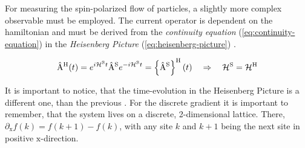 
For measuring the spin-polarized flow of particles, a slightly more complex observable must be employed. 
The current operator is dependent on the hamiltonian and must be derived from the \emph{continuity equation} (\autoref{eq:continuity-equation}) in the \emph{Heisenberg Picture} (\autoref{eq:heisenberg-picture}) \cite{discreteDivergenceAndOtherCurrentDerivation}.

\begin{equation}
    \label{eq:heisenberg-picture}
    \begin{split}
        \AopOfT[\heisenbergPicture] &= e^{i \pictureHamiltonian[\schroedingerPicture]{} t} \Aop[\schroedingerPicture] e^{-i \pictureHamiltonian[\schroedingerPicture]{} t}
        =  \heisenbergTimeEvolution{\Aop[\schroedingerPicture]}
        \quad \Rightarrow \quad 
        \pictureHamiltonian[\schroedingerPicture]{} = \pictureHamiltonian[\heisenbergPicture]{}\\
    \end{split}
\end{equation}

It is important to notice, that the time-evolution in the Heisenberg Picture \heisenbergTimeEvolution{\ast} is a different one, than the previous \interactionTimeEvolution{\ast}.
For the discrete gradient \discreteGradient it is important to remember, that the system lives on a discrete, 2-dimensional lattice.
There, $\partial_\text{x} f(k) = f(k+1) - f(k)$, with any site $k$ and $k+1$ being the \glqq{}next\grqq{} site in positive $\text{x}$-direction.

